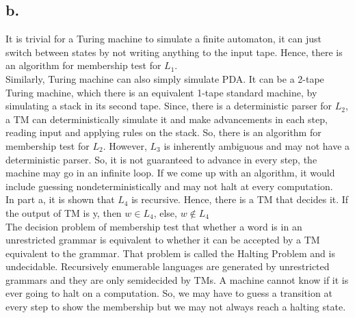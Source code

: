 \documentclass[12pt]{article}
\begin{document}
\subsection*{b.}
\-\hspace{1cm}It is trivial for a Turing machine to simulate a finite automaton, it can just switch between states by not writing anything to the input tape. Hence, there is an algorithm for membership test for $L_1$.\\
\-\hspace{1cm}Similarly, Turing machine can also simply simulate PDA. It can be a 2-tape Turing machine, which there is an equivalent 1-tape standard machine, by simulating a stack in its second tape. Since, there is a deterministic parser for $L_2$, a TM can deterministically simulate it and make advancements in each step, reading input and applying rules on the stack. So, there is an algorithm for membership test for $L_2$. However, $L_3$ is inherently ambiguous and may not have a deterministic parser. So, it is not guaranteed to advance in every step, the machine may go in an infinite loop. If we come up with an algorithm, it would include guessing nondeterministically and may not halt at every computation.\\
\-\hspace{1cm} In part a, it is shown that $L_4$ is recursive. Hence, there is a TM that decides it. If the output of TM is y, then $w\in L_4$, else, $w\notin L_4$\\
\-\hspace{1cm} The decision problem of membership test that whether a word is in an unrestricted grammar is equivalent to whether it can be accepted by a TM equivalent to the grammar. That problem is called the Halting Problem and is undecidable. Recursively enumerable languages are generated by unrestricted grammars and they are only semidecided by TMs. A machine cannot know if it is ever going to halt on a computation. So, we may have to guess a transition at every step to show the membership but we may not always reach a halting state.
\end{document}

